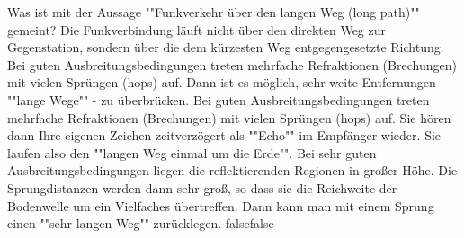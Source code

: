     {Was ist mit der Aussage ""Funkverkehr über den langen Weg (long path)"" gemeint?}
    {Die Funkverbindung läuft nicht über den direkten Weg zur Gegenstation, sondern über die dem kürzesten Weg entgegengesetzte Richtung.}
    {Bei guten Ausbreitungsbedingungen treten mehrfache Refraktionen (Brechungen) mit vielen Sprüngen (hops) auf. Dann ist es möglich, sehr weite Entfernungen - ""lange Wege"" - zu überbrücken.}
    {Bei guten Ausbreitungsbedingungen treten mehrfache Refraktionen (Brechungen) mit vielen Sprüngen (hops) auf. Sie hören dann Ihre eigenen Zeichen zeitverzögert als ""Echo"" im Empfänger wieder. Sie laufen also den ""langen Weg einmal um die Erde"".}
    {Bei sehr guten Ausbreitungsbedingungen liegen die reflektierenden Regionen in großer Höhe. Die Sprungdistanzen werden dann sehr groß, so dass sie die Reichweite der Bodenwelle um ein Vielfaches übertreffen. Dann kann man mit einem Sprung einen ""sehr langen Weg"" zurücklegen.}
    {false}{false}